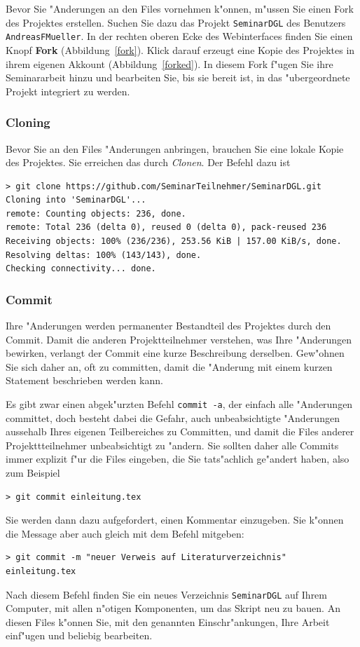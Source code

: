 \documentclass[a4paper,12pt]{article}
\begin{document}
Bevor Sie "Anderungen an den Files vornehmen k"onnen, m"ussen Sie
einen Fork des Projektes erstellen.
Suchen Sie dazu das Projekt \texttt{SeminarDGL} des Benutzers
\texttt{AndreasFMueller}.
In der rechten oberen Ecke des Webinterfaces finden Sie einen Knopf
\textbf{Fork} (Abbildung~\ref{fork}).
Klick darauf erzeugt eine Kopie des Projektes in ihrem eigenen Akkount
(Abbildung~\ref{forked}).
In diesem Fork f"ugen Sie ihre Seminararbeit hinzu und bearbeiten
Sie, bis sie bereit ist, in das "ubergeordnete Projekt integriert
zu werden.

\subsubsection{Cloning}
Bevor Sie an den Files "Anderungen anbringen, brauchen Sie eine 
lokale Kopie des Projektes.
Sie erreichen das durch {\em Clonen}.
Der Befehl dazu ist
\begin{verbatim}
> git clone https://github.com/SeminarTeilnehmer/SeminarDGL.git
Cloning into 'SeminarDGL'...
remote: Counting objects: 236, done.
remote: Total 236 (delta 0), reused 0 (delta 0), pack-reused 236
Receiving objects: 100% (236/236), 253.56 KiB | 157.00 KiB/s, done.
Resolving deltas: 100% (143/143), done.
Checking connectivity... done.
\end{verbatim}


\subsubsection{Commit}
Ihre "Anderungen werden permanenter Bestandteil des Projektes durch 
den Commit.
Damit die anderen Projektteilnehmer verstehen, was Ihre "Anderungen
bewirken, verlangt der Commit eine kurze Beschreibung derselben.
Gew"ohnen Sie sich daher an, oft zu committen, damit die "Anderung
mit einem kurzen Statement beschrieben werden kann.

Es gibt zwar einen abgek"urzten Befehl \texttt{commit -a}, der einfach
alle "Anderungen committet, doch besteht dabei die Gefahr, auch
unbeabsichtigte "Anderungen aussehalb Ihres eigenen Teilbereiches zu 
Committen, und damit die Files anderer Projekttteilnehmer unbeabsichtigt
zu "andern.
Sie sollten daher alle Commits immer explizit f"ur die Files eingeben,
die Sie tats"achlich ge"andert haben, also zum Beispiel
\begin{verbatim}
> git commit einleitung.tex
\end{verbatim}
Sie werden dann dazu aufgefordert, einen Kommentar einzugeben. 
Sie k"onnen die Message aber auch gleich mit dem Befehl mitgeben:
\begin{verbatim}
> git commit -m "neuer Verweis auf Literaturverzeichnis" einleitung.tex
\end{verbatim}
Nach diesem Befehl finden Sie ein neues Verzeichnis \texttt{SeminarDGL}
auf Ihrem Computer, mit allen n"otigen Komponenten, um das Skript
neu zu bauen.
An diesen Files k"onnen Sie, mit den genannten Einschr"ankungen,
Ihre Arbeit einf"ugen und beliebig bearbeiten.
\end{document}
